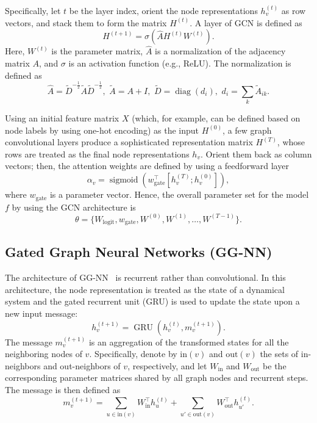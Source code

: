\documentclass[letterpaper]{article} %
\DeclareMathOperator{\diag}{diag}
\DeclareMathOperator{\sigmoid}{sigmoid}
\DeclareMathOperator{\gru}{GRU}
\begin{document}
Specifically, let $t$ be the layer index, orient the node representations $h_v^{(t)}$ as row vectors, and stack them to form the matrix $H^{(t)}$. A layer of GCN is defined as
\[
H^{(t+1)}=\sigma(\widehat{A}H^{(t)}W^{(t)}).
\]
Here, $W^{(t)}$ is the parameter matrix, $\widehat{A}$ is a normalization of the adjacency matrix $A$, and $\sigma$ is an activation function (e.g., ReLU). 
The normalization is defined as
\[
\widehat{A}=\widetilde{D}^{-\frac{1}{2}}\widetilde{A}\widetilde{D}^{-\frac{1}{2}},
\,\, \widetilde{A}=A+I,
\,\, \widetilde{D}=\diag(d_i),
\,\, d_i=\sum_k\widetilde{A}_{ik}.
\]

Using an initial feature matrix $X$ (which, for example, can be defined based on node labels by using one-hot encoding) as the input $H^{(0)}$, a few graph convolutional layers produce a sophisticated representation matrix $H^{(T)}$, whose rows are treated as the final node representations $h_v$. Orient them back as column vectors; then, the attention weights are defined by using a feedforward layer
\begin{equation}\label{eqn:alpha}
\alpha_v=\sigmoid(w_{\text{gate}}^{\top}[h_v^{(T)};h_v^{(0)}]),
\end{equation}
where $w_{\text{gate}}$ is a parameter vector. Hence, the overall parameter set for the model $f$ by using the GCN architecture is
\[
\theta=\{W_{\text{logit}}, w_{\text{gate}}, W^{(0)}, W^{(1)}, \ldots, W^{(T-1)}\}.
\]


\subsection{Gated Graph Neural Networks (GG-NN)}
The architecture of GG-NN~\cite{Li2016} is recurrent rather than convolutional. In this architecture, the node representation is treated as the state of a dynamical system and the gated recurrent unit (GRU) is used to update the state upon a new input message:
\[
h_v^{(t+1)}=\gru(h_v^{(t)},m_v^{(t+1)}).
\]
The message $m_v^{(t+1)}$ is an aggregation of the transformed states for all the neighboring nodes of $v$. Specifically, denote by $\text{in}(v)$ and $\text{out}(v)$ the sets of in-neighbors and out-neighbors of $v$, respectively, and let $W_{\text{in}}$ and $W_{\text{out}}$ be the corresponding parameter matrices shared by all graph nodes and recurrent steps. The message is then defined as
\[
m_v^{(t+1)}=\sum_{u\in \text{in}(v)}W_{\text{in}}^{\top}h_u^{(t)}
+\sum_{u'\in \text{out}(v)}W_{\text{out}}^{\top}h_{u'}^{(t)}.
\]
\end{document}
